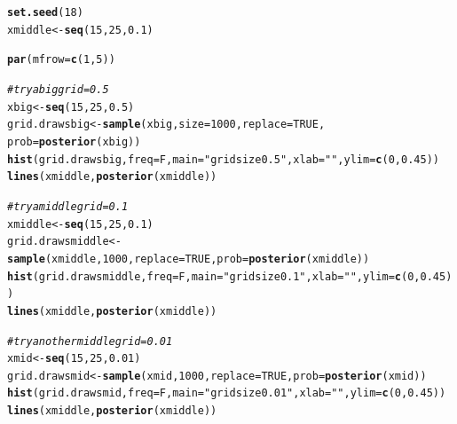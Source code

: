 \documentclass[12pt]{article}\usepackage[]{graphicx}\usepackage[]{color}
\makeatletter
\newcommand{\hlnum}[1]{\textcolor[rgb]{0.686,0.059,0.569}{#1}}%
\newcommand{\hlstr}[1]{\textcolor[rgb]{0.192,0.494,0.8}{#1}}%
\newcommand{\hlcom}[1]{\textcolor[rgb]{0.678,0.584,0.686}{\textit{#1}}}%
\newcommand{\hlstd}[1]{\textcolor[rgb]{0.345,0.345,0.345}{#1}}%
\newcommand{\hlkwb}[1]{\textcolor[rgb]{0.69,0.353,0.396}{#1}}%
\newcommand{\hlkwc}[1]{\textcolor[rgb]{0.333,0.667,0.333}{#1}}%
\newcommand{\hlkwd}[1]{\textcolor[rgb]{0.737,0.353,0.396}{\textbf{#1}}}%
\newenvironment{kframe}{%
 \def\at@end@of@kframe{}%
 \ifinner\ifhmode%
  \def\at@end@of@kframe{\end{minipage}}%
  \begin{minipage}{\columnwidth}%
 \fi\fi%
 \def\FrameCommand##1{\hskip\@totalleftmargin \hskip-\fboxsep
 \colorbox{shadecolor}{##1}\hskip-\fboxsep
     \hskip-\linewidth \hskip-\@totalleftmargin \hskip\columnwidth}%
 \MakeFramed {\advance\hsize-\width
   \@totalleftmargin\z@ \linewidth\hsize
   \@setminipage}}%
 {\par\unskip\endMakeFramed%
 \at@end@of@kframe}
\newenvironment{knitrout}{}{} %
\makeatother
\begin{document}
\begin{knitrout}\footnotesize
{}\color{fgcolor}\begin{kframe}
\begin{alltt}
\hlkwd{set.seed}\hlstd{(}\hlnum{18}\hlstd{)}
\hlstd{xmiddle} \hlkwb{<-} \hlkwd{seq}\hlstd{(}\hlnum{15}\hlstd{,} \hlnum{25}\hlstd{,} \hlnum{0.1}\hlstd{)}

\hlkwd{par}\hlstd{(}\hlkwc{mfrow}\hlstd{=}\hlkwd{c}\hlstd{(}\hlnum{1}\hlstd{,}\hlnum{5}\hlstd{))}

\hlcom{#try a big grid=0.5}
\hlstd{xbig} \hlkwb{<-} \hlkwd{seq}\hlstd{(}\hlnum{15}\hlstd{,} \hlnum{25}\hlstd{,} \hlnum{0.5}\hlstd{)}
\hlstd{grid.drawsbig} \hlkwb{<-} \hlkwd{sample}\hlstd{(xbig,} \hlkwc{size}\hlstd{=}\hlnum{1000}\hlstd{,} \hlkwc{replace} \hlstd{=} \hlnum{TRUE}\hlstd{,}
                            \hlkwc{prob} \hlstd{=} \hlkwd{posterior}\hlstd{(xbig))}
\hlkwd{hist}\hlstd{(grid.drawsbig,} \hlkwc{freq}\hlstd{=F,} \hlkwc{main}\hlstd{=}\hlstr{"grid size 0.5"}\hlstd{,} \hlkwc{xlab}\hlstd{=}\hlstr{""}\hlstd{,} \hlkwc{ylim}\hlstd{=}\hlkwd{c}\hlstd{(}\hlnum{0}\hlstd{,} \hlnum{0.45}\hlstd{))}
\hlkwd{lines}\hlstd{(xmiddle,} \hlkwd{posterior}\hlstd{(xmiddle))}

\hlcom{#try a middle grid=0.1}
\hlstd{xmiddle} \hlkwb{<-} \hlkwd{seq}\hlstd{(}\hlnum{15}\hlstd{,} \hlnum{25}\hlstd{,} \hlnum{0.1}\hlstd{)}
\hlstd{grid.drawsmiddle} \hlkwb{<-} \hlkwd{sample}\hlstd{(xmiddle,} \hlnum{1000}\hlstd{,} \hlkwc{replace}\hlstd{=}\hlnum{TRUE}\hlstd{,} \hlkwc{prob}\hlstd{=}\hlkwd{posterior}\hlstd{(xmiddle))}
\hlkwd{hist}\hlstd{(grid.drawsmiddle,} \hlkwc{freq}\hlstd{=F,} \hlkwc{main}\hlstd{=}\hlstr{"grid size 0.1"}\hlstd{,} \hlkwc{xlab}\hlstd{=}\hlstr{""}\hlstd{,} \hlkwc{ylim}\hlstd{=}\hlkwd{c}\hlstd{(}\hlnum{0}\hlstd{,} \hlnum{0.45}\hlstd{))}
\hlkwd{lines}\hlstd{(xmiddle,} \hlkwd{posterior}\hlstd{(xmiddle))}

\hlcom{#try another middle grid=0.01}
\hlstd{xmid} \hlkwb{<-} \hlkwd{seq}\hlstd{(}\hlnum{15}\hlstd{,} \hlnum{25}\hlstd{,} \hlnum{0.01}\hlstd{)}
\hlstd{grid.drawsmid} \hlkwb{<-} \hlkwd{sample}\hlstd{(xmid,} \hlnum{1000}\hlstd{,} \hlkwc{replace}\hlstd{=}\hlnum{TRUE}\hlstd{,} \hlkwc{prob}\hlstd{=}\hlkwd{posterior}\hlstd{(xmid))}
\hlkwd{hist}\hlstd{(grid.drawsmid,} \hlkwc{freq}\hlstd{=F,} \hlkwc{main}\hlstd{=}\hlstr{"grid size 0.01"}\hlstd{,} \hlkwc{xlab}\hlstd{=}\hlstr{""}\hlstd{,} \hlkwc{ylim}\hlstd{=}\hlkwd{c}\hlstd{(}\hlnum{0}\hlstd{,} \hlnum{0.45}\hlstd{))}
\hlkwd{lines}\hlstd{(xmiddle,} \hlkwd{posterior}\hlstd{(xmiddle))}


\end{alltt}
\end{kframe}
\end{knitrout}
\end{document}
